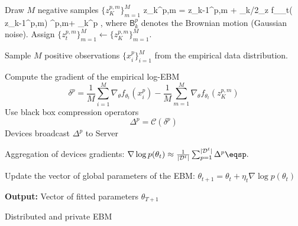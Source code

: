 \documentclass[11pt]{article}
\begin{document}
\begin{algorithm}[H]
\DontPrintSemicolon
  
\hrulefill

{	
	
	{
		{Draw $M$ negative samples $\{ z_{K}^{p,m} \}_{m=1}^M$} 
			{
			\beq\notag
			z_{k}^{p,m} = z_{k-1}^{p,m} + \gamma_k/2\nabla_z f_{\theta_t}( z_{k-1}^{p,m})  ^{p,m}+  _k^p \eqsp,
			\eeq
			where $\mathsf{B}_k^p$ denotes the Brownian motion (Gaussian noise).
			}
		{Assign $\{ z_{t}^{p,m} \}_{m=1}^M \leftarrow \{ z_{K}^{p,m} \}_{m=1}^M$.}
		
		{Sample $M$ positive observations $\{ x^p_{i} \}_{i=1}^M$ from the empirical data distribution.}
		
		{Compute the gradient of the empirical log-EBM} 
		{
		$$\delta^p = \frac{1}{M} \sum_{i=1}^{M} \nabla_{\theta} f_{\theta_t}\left(x^p_{i}\right)- \frac{1}{M} 	\sum_{m=1}^{M} \nabla_{\theta} f_{\theta_t}\left(z_K^{p,m}\right)$$
		}
		{Use black box compression operators}
		{
		$$\Delta^p = \mathcal{C}(\delta^p )$$
		}
		{Devices broadcast $\Delta^p$ to Server} 
	}
	
	  
	{Aggregation of devices gradients: $\nabla \log p(\theta_t) \approx  \frac{1}{|\mathcal{D}^t|} \sum_{p=1}^{|\mathcal{D}^t|} \Delta^p\eqsp.$}

	{Update the vector of global parameters of the EBM: $\theta_{t+1} = \theta_{t} + \eta_t \nabla \log p(\theta_t)$}
 }
 { \textbf{Output:} Vector of fitted parameters $\theta_{T+1}$} 
\caption{Distributed and private EBM}
\end{algorithm}
\end{document}
